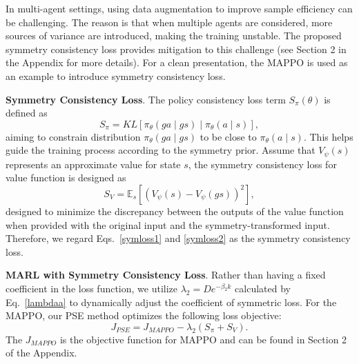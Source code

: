 \documentclass[letterpaper]{article} %
\theoremstyle{definition}
\begin{document}
In multi-agent settings, using data augmentation to improve sample efficiency can be challenging. The reason is that when multiple agents are considered, more sources of variance are introduced, making the training unstable. The proposed symmetry consistency loss provides mitigation to this challenge (see Section 2 in the Appendix for more details). For a clean presentation, the MAPPO is used as an example to introduce symmetry consistency loss. 


\textbf{Symmetry Consistency Loss}.
The policy consistency loss term $S_\pi(\theta)$ is defined as
\begin{equation}
S_\pi=K L\left[\pi_\theta(ga \mid gs) \mid \pi_\theta(a \mid s)\right],\label{symloss1}
\end{equation}
aiming to constrain distribution $\pi_\theta(ga \mid gs)$ to be close to $\pi_\theta(a \mid s)$. This helps guide the training process according to the symmetry prior. Assume that $V_\psi(s)$ represents an approximate value for state $s$, the symmetry consistency loss for value function is designed as
\begin{equation}
S_V=\mathbb{E}_{s}\left[\left(V_\psi(s)-V_\psi\left(gs\right)\right)^2\right],\label{symloss2}
\end{equation}
designed to minimize the discrepancy between the outputs of the value function when provided with the original input and the symmetry-transformed input. Therefore, we regard Eqs.~\eqref{symloss1} and \eqref{symloss2} as the symmetry consistency loss.

\textbf{MARL with Symmetry Consistency Loss}. Rather than having a fixed coefficient in the loss function, we utilize $\lambda _2=D e^{-\beta_2 k}$ calculated by Eq.~\eqref{lambdaa} to dynamically adjust the coefficient of symmetric loss. For the MAPPO, our PSE method optimizes the following loss objective:
\begin{equation}
J_{PSE} = J_{MAPPO} - \lambda_2 (S_\pi + S_V).
\end{equation}
The $J_{MAPPO}$ is the objective function for MAPPO and can be found in Section 2 of the Appendix.
\end{document}
